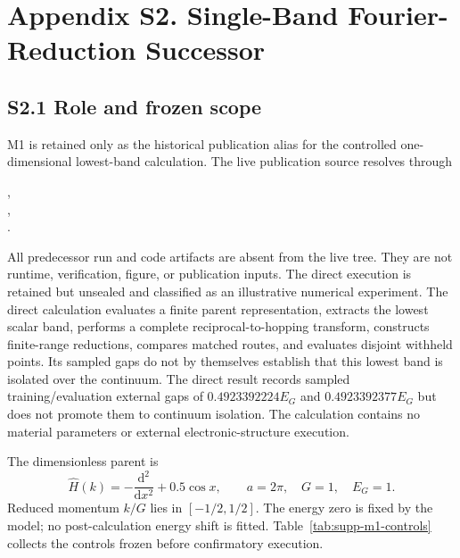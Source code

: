 \section*{Appendix S2. Single-Band Fourier-Reduction Successor}
\label{supp:m1-isolated-band}
\renewcommand{\theequation}{S2.\arabic{equation}}
\setcounter{equation}{0}
\renewcommand{\thetable}{S2.\arabic{table}}
\setcounter{table}{0}

\subsection*{S2.1 Role and frozen scope}

M1 is retained only as the historical publication alias for the controlled
one-dimensional lowest-band calculation. The live publication source resolves through
\begin{center}
,\\
,\\
.
\end{center}
All predecessor run and code artifacts are absent from the live tree. They are not
runtime, verification, figure, or publication inputs. The direct execution is retained
but unsealed and classified as an illustrative numerical experiment. The direct
calculation evaluates a finite parent representation, extracts the lowest scalar band,
performs a complete reciprocal-to-hopping transform, constructs finite-range reductions,
compares matched routes, and evaluates disjoint withheld points. Its sampled gaps do not
by themselves establish that this lowest band is isolated over the continuum. The
direct result records sampled training/evaluation external gaps of
$0.4923392224E_G$ and $0.4923392377E_G$ but does not promote them to continuum
isolation. The calculation contains no material parameters or external
electronic-structure execution.

The dimensionless parent is
\begin{equation}
 \widehat H(k)=-\frac{\mathrm d^2}{\mathrm d x^2}+0.5\cos x,
 \qquad a=2\pi,\quad G=1,\quad E_G=1.
 \label{eq:supp-m1-parent}
\end{equation}
Reduced momentum $k/G$ lies in $[-1/2,1/2]$. The energy zero is fixed by the
model; no post-calculation energy shift is fitted. Table~\ref{tab:supp-m1-controls}
collects the controls frozen before confirmatory execution.

